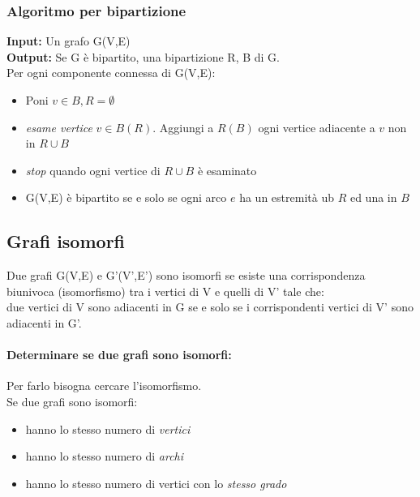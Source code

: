\subsubsection{Algoritmo per bipartizione}
\textbf{Input:} Un grafo G(V,E) \\
\textbf{Output:} Se G è bipartito, una bipartizione R, B di G. \\
Per ogni componente connessa di G(V,E):
\begin{itemize}
\item Poni \(v \in B , R = \emptyset \)
\item \emph{esame vertice} $v \in B (R)$. Aggiungi a $R (B)$ ogni vertice adiacente a $v$ non in $R \cup B$
\item \emph{stop} quando ogni vertice di $R \cup B$ è esaminato
\item G(V,E) è bipartito se e solo se ogni arco $e$ ha un estremità ub $R$ ed una in $B$
\end{itemize}



\subsection{Grafi isomorfi}

Due grafi G(V,E) e G'(V',E') sono isomorfi se esiste una corrispondenza biunivoca (isomorfismo) tra i
vertici di V e quelli di V' tale che: \\
due vertici di V sono adiacenti in G se e solo se i corrispondenti vertici di V' sono adiacenti in G'. \\
\paragraph{Determinare se due grafi sono isomorfi:}
Per farlo bisogna cercare l'isomorfismo. \\
Se due grafi sono isomorfi:
\begin{itemize}
\item hanno lo stesso numero di \emph{vertici}
\item hanno lo stesso numero di \emph{archi}
\item hanno lo stesso numero di vertici con lo \emph{stesso grado}
\end{itemize}

